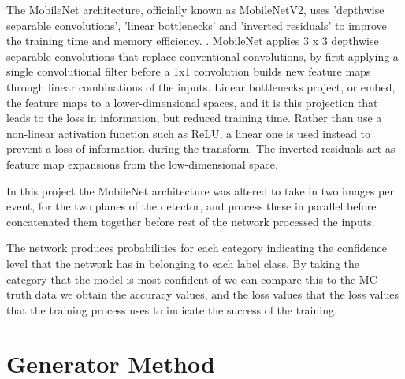 \noindent The MobileNet architecture, officially known as MobileNetV2, uses 'depthwise separable convolutions', 'linear bottlenecks' and 'inverted residuals' to improve the training time and memory efficiency. \cite{Sandler}. MobileNet applies 3 x 3 depthwise separable convolutions that replace conventional convolutions, by first applying a single convolutional filter before a 1x1 convolution builds new feature maps through linear combinations of the inputs. Linear bottlenecks project, or embed, the feature maps to a lower-dimensional spaces, and it is this projection that leads to the loss in information, but reduced training time. Rather than use a non-linear activation function such as ReLU, a linear one is used instead to prevent a loss of information during the transform. The inverted residuals act as feature map expansions from the low-dimensional space.\medskip

\noindent In this project the MobileNet architecture was altered to take in two images per event, for the two planes of the detector, and process these in parallel before concatenated them together before rest of the network processed the inputs.\medskip

\noindent The network produces probabilities for each category indicating the confidence level that the network has in belonging to each label class. By taking the category that the model is most confident of we can compare this to the MC truth data we obtain the accuracy values, and the loss values that the loss values that the training process uses to indicate the success of the training. \medskip

\section{Generator Method}

